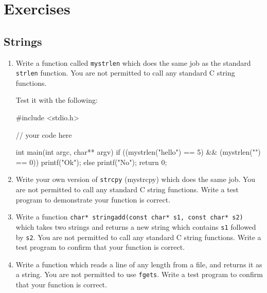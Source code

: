 
\chapter{Exercises}



\section*{Strings}

\begin{enumerate}
\item
Write a function called \texttt{mystrlen} which does the same job as the standard \texttt{strlen} function.
You are not permitted to call any standard C string functions.

Test it with the following:
\begin{codeinline}
#include <stdio.h>

// your code here

int main(int argc, char** argv) {
    if ((mystrlen("hello") == 5) && (mystrlen("") == 0)) {
        printf("Ok\n");
    } else {
        printf("No\n");
    }
    return 0;
}
\end{codeinline}

\item Write your own version of \texttt{strcpy} (mystrcpy) which does the same job.
You are not permitted to call any standard C string functions.
Write a test program to demonstrate your function is correct.

\item Write a function \lstinline!char* stringadd(const char* s1, const char* s2)! which takes two strings and 
returns a new string which contains \texttt{s1} followed by \texttt{s2}.
You are not permitted to call any standard C string functions.
Write a test program to confirm that your function is correct.

\item Write a function which reads a line of any length from a file, and returns it as a string.
You are not permitted to use \texttt{fgets}.
Write a test program to confirm that your function is correct.
 
\end{enumerate}
